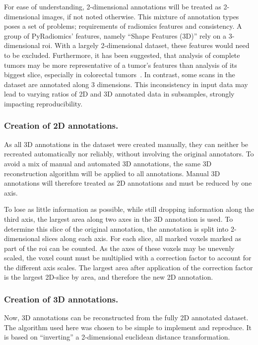For ease of understanding, 
2-dimensional annotations will be treated as 2-dimensional images, if not
noted otherwise.
This mixture of annotation types poses a set of problems; requirements of radiomics
features and consistency. A group of PyRadiomics' features, namely 
\enquote{Shape Features (3D)} rely on a 3-dimensional \ac{roi}. With a largely 2-dimensional
dataset, these features would need to be excluded. Furthermore, it has been suggested, 
that analysis of complete tumors may be more representative
of a tumor's features than analysis of its biggest slice, especially in colorectal 
tumors~\cite{whole_tumor_vs_cross_section}\cite{rad_in_prec_med}.
In contrast, some scans in the dataset are annotated along 3 dimensions. 
This inconsistency in input data may lead to varying ratios of 2D and 3D 
annotated data in subsamples, strongly impacting reproducibility.

\subsubsection{Creation of 2D annotations.}
As all 3D annotations in the dataset were created manually, they can neither
be recreated automatically nor reliably, without involving the original annotators.
To avoid a mix of manual and automated 3D annotations, the same 3D reconstruction 
algorithm will be applied to all annotations.
Manual 3D annotations will therefore treated as 2D annotations 
and must be reduced by one axis.

To lose as little information as possible, while still dropping information along the third
axis, the largest area along two axes in the 3D annotation is used. To determine this slice
of the original annotation, the annotation is split into 2-dimensional slices along each axis.
For each slice, all marked voxels marked as part of the \ac{roi} can be counted. As the axes of 
these voxels may be unevenly scaled, the voxel count must be multiplied with a correction factor to account for
the different axis scales. The largest area after application of the correction factor is the 
largest 2D-slice by area, and therefore the new 2D annotation.

\subsubsection{Creation of 3D annotations.}
Now, 3D annotations can be reconstructed from the fully 2D annotated dataset.
The algorithm used here was chosen to be simple to implement and reproduce.
It is based on \enquote{inverting} a 2-dimensional euclidean distance 
transformation. %


